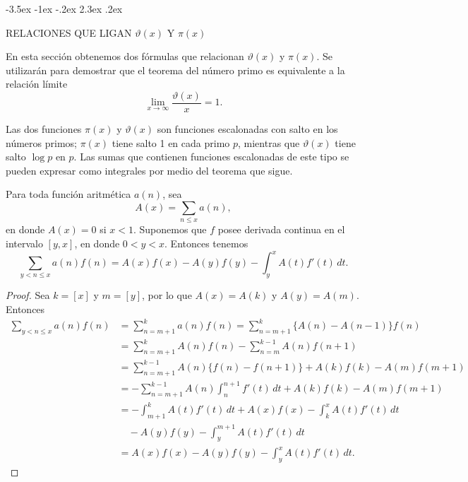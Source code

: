 \documentclass[12pt,a4paper]{book}
\makeatletter
\renewcommand\section{\@startsection{section}{1}{\z@}%
  {-3.5ex \@plus -1ex \@minus -.2ex}%
  {2.3ex \@plus .2ex}%
  {\normalfont\Large\bfseries\raggedright}}
\makeatother
\begin{document}
    \section{RELACIONES QUE LIGAN \texorpdfstring{$\vartheta(x)$}{ϑ(x)} Y \texorpdfstring{$\pi(x)$}{π(x)}}

    En esta sección obtenemos dos fórmulas que relacionan $\vartheta(x)$ y $\pi(x)$. Se
    utilizarán para demostrar que el teorema del número primo es equivalente a la
    relación límite
    \begin{equation*}
        \lim_{x\to\infty}\frac{\vartheta(x)}{x}=1.
    \end{equation*}

    Las dos funciones $\pi(x)$ y $\vartheta(x)$ son funciones escalonadas con salto en
    los números primos; $\pi(x)$ tiene salto 1 en cada primo $p$, mientras que
    $\vartheta(x)$ tiene salto $\log p$ en $p$. Las sumas que contienen funciones
    escalonadas de este tipo se pueden expresar como integrales por medio del teorema
    que sigue.

    \begin{teorema}
        Para toda función aritmética $a(n)$, sea
        \begin{equation*}
            A(x)=\sum_{n\leq x}a(n),
        \end{equation*}
        en donde $A(x)=0$ si $x<1$. Suponemos que $f$ posee derivada continua en el
        intervalo $[y,x]$, en donde $0<y<x$. Entonces tenemos
        \begin{equation}
            \sum_{y<n\leq x}a(n)f(n)=A(x)f(x)-A(y)f(y)-\int_{y}^{x} A(t)f'(t)\,dt.
        \end{equation}
    \end{teorema}

    \begin{proof}
        Sea $k=[x]$ y $m=[y]$, por lo que $A(x)=A(k)$ y $A(y)=A(m)$. Entonces
        \begin{align*}
            \sum_{y<n\leq x}a(n)f(n)&=\sum_{n=m+1}^{k}a(n)f(n)=\sum_{n=m+1}^{k}\{A(n)-A(n-1)\}f(n)\\
            &=\sum_{n=m+1}^{k}A(n)f(n)-\sum_{n=m}^{k-1}A(n)f(n+1)\\
            &=\sum_{n=m+1}^{k-1}A(n)\{f(n)-f(n+1)\}+A(k)f(k)-A(m)f(m+1)\\
            &=-\sum_{n=m+1}^{k-1}A(n)\int_{n}^{n+1}f'(t)\,dt+A(k)f(k)-A(m)f(m+1)\\
            &=-\int_{m+1}^{k}A(t)f'(t)\,dt+A(x)f(x)-\int_{k}^{x} A(t)f'(t)\,dt\\
            &\quad-A(y)f(y)-\int_{y}^{m+1}A(t)f'(t)\,dt\\
            &=A(x)f(x)-A(y)f(y)-\int_{y}^{x} A(t)f'(t)\,dt.
        \end{align*}
    \end{proof}
\end{document}
